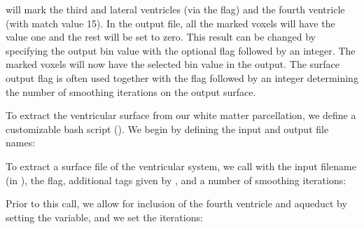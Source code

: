 \noindent will mark the third and lateral ventricles (via the
 flag) and the fourth ventricle (with match value
15). In the output file, all the marked voxels will have the value one
and the rest will be set to zero. This result can be changed by specifying the
output bin value with the optional flag  followed by an
integer. The marked voxels will now have the selected bin value in the
output. The surface output flag  is often used together
with the flag  followed by an integer determining
the number of smoothing iterations on the output surface. 

To extract the ventricular surface from our white matter parcellation,
we define a customizable bash script (). We begin by defining the input and output file names:


\noindent To extract a surface file of the ventricular system, we call
 with the input filename (in ), the  flag, additional tags given by , and a number of smoothing iterations:


\noindent Prior to this call, we allow for inclusion of the fourth
ventricle and aqueduct by setting the  variable, and
we set the  iterations:


